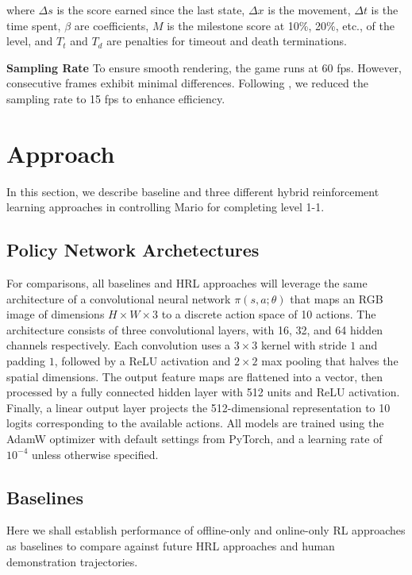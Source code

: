 \documentclass{article}
\begin{document}
where $\Delta s$ is the score earned since the last state, $\Delta x$ is the 
movement, $\Delta t$ is the time spent, $\beta$ are coefficients, $M$ is the 
milestone score at 10\%, 20\%, etc., of the level, and $T_t$ and $T_d$ are 
penalties for timeout and death terminations.

\textbf{Sampling Rate}
To ensure smooth rendering, the game runs at 60 fps. However, consecutive 
frames exhibit minimal differences. Following \cite{pytorch_mario_rl_tutorial}, 
we reduced the sampling rate to 15 fps to enhance efficiency.



\section{Approach}
In this section, we describe baseline and three different hybrid reinforcement 
learning approaches in controlling Mario for completing level 1-1.

\subsection{Policy Network Archetectures}

For comparisons, all baselines and HRL approaches will leverage the same 
architecture of a convolutional neural network $\pi(s,a;\theta)$ that maps an RGB image of 
dimensions \(H \times W \times 3\) to a discrete action space of 10 actions. 
The architecture consists of three convolutional layers, with 16, 32, and 64 
hidden channels respectively. Each convolution uses a \(3 \times 3\) kernel 
with stride $1$ and padding $1$, followed by a ReLU activation and \(2 \times 
2\) max pooling that halves the spatial dimensions. The output feature maps 
are flattened into a vector, then processed by a fully connected hidden layer 
with 512 units and ReLU activation. Finally, a linear output layer projects 
the 512-dimensional representation to 10 logits corresponding to the available 
actions.
All models are trained using the AdamW optimizer with default settings from 
PyTorch, and a learning rate of $10^{-4}$ unless otherwise specified.

\subsection{Baselines}
Here we shall establish performance of offline-only and online-only RL approaches
as baselines to compare against future HRL approaches and human demonstration trajectories. 
\end{document}
